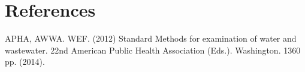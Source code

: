 \documentclass[12pt]{../SOP4_alpha}\usepackage[]{graphicx}\usepackage[]{color}
\begin{document}
\section{References}

\NP APHA, AWWA. WEF. (2012) Standard Methods for examination of water and wastewater. 22nd American Public Health Association (Eds.). Washington. 1360 pp. (2014).
\end{document}
